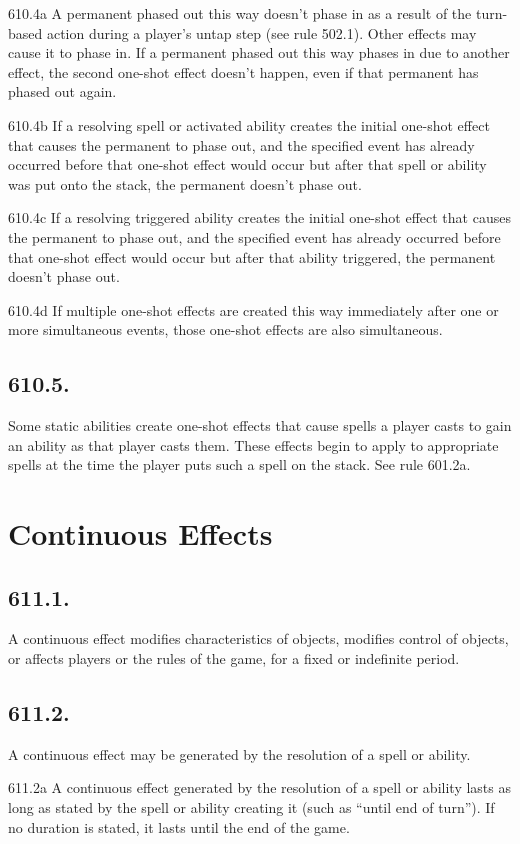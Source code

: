 610.4a A permanent phased out this way doesn’t phase in as a result of the turn-based action during a player’s untap step (see rule 502.1). Other effects may cause it to phase in. If a permanent phased out this way phases in due to another effect, the second one-shot effect doesn’t happen, even if that permanent has phased out again.

610.4b If a resolving spell or activated ability creates the initial one-shot effect that causes the permanent to phase out, and the specified event has already occurred before that one-shot effect would occur but after that spell or ability was put onto the stack, the permanent doesn’t phase out.

610.4c If a resolving triggered ability creates the initial one-shot effect that causes the permanent to phase out, and the specified event has already occurred before that one-shot effect would occur but after that ability triggered, the permanent doesn’t phase out.

610.4d If multiple one-shot effects are created this way immediately after one or more simultaneous events, those one-shot effects are also simultaneous.

\subsection*{610.5.}
Some static abilities create one-shot effects that cause spells a player casts to gain an ability as that player casts them. These effects begin to apply to appropriate spells at the time the player puts such a spell on the stack. See rule 601.2a.

\section{Continuous Effects}
\subsection*{611.1.}
A continuous effect modifies characteristics of objects, modifies control of objects, or affects players or the rules of the game, for a fixed or indefinite period.

\subsection*{611.2.}
A continuous effect may be generated by the resolution of a spell or ability.

611.2a A continuous effect generated by the resolution of a spell or ability lasts as long as stated by the spell or ability creating it (such as “until end of turn”). If no duration is stated, it lasts until the end of the game.

